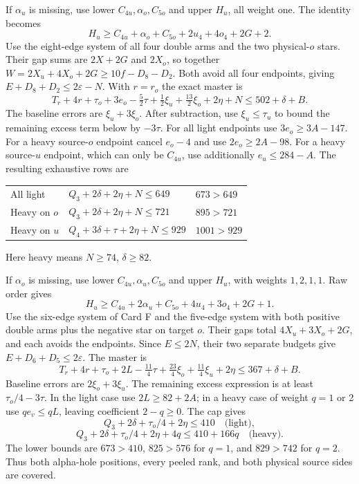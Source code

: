 \documentclass[11pt,letterpaper]{article}
\theoremstyle{definition}\newtheorem{definition}[theorem]{Definition}
\begin{document}
If $\alpha_u$ is missing, use lower $C_{4u},\alpha_o,C_{5o}$ and upper $H_u$, all weight one. The identity becomes
\[
 H_u\ge C_{4u}+\alpha_o+C_{5o}+2u_4+4o_4+2G+2.
\]
Use the eight-edge system of all four double arms and the two physical-$o$ stars. Their gap sums are $2X+2G$ and $2X_o$, so together $W=2X_u+4X_o+2G\ge10f-D_8-D_2$. Both avoid all four endpoints, giving $E+D_8+D_2\le2\varepsilon-N$. With $r=r_o$ the exact master is
\[
 T_r+4r+\tau_o+3e_o-\tfrac52\tau+\tfrac12\xi_u+\tfrac{13}2\xi_o+2\eta+N
 \le502+\delta+B.
\]
The baseline errors are $\xi_u+3\xi_o$. After subtraction, use $\xi_u\le\tau_u$ to bound the remaining excess term below by $-3\tau$. For all light endpoints use $3e_o\ge3A-147$. For a heavy source-$o$ endpoint cancel $e_o-4$ and use $2e_o\ge2A-98$. For a heavy source-$u$ endpoint, which can only be $C_{4u}$, use additionally $e_u\le284-A$. The resulting exhaustive rows are
\begin{center}\small
\begin{tabular}{lll}
All light&$Q_3+2\delta+2\eta+N\le649$&$673>649$\\
Heavy on $o$&$Q_3+2\delta+2\eta+N\le721$&$895>721$\\
Heavy on $u$&$Q_4+3\delta+\tau+2\eta+N\le929$&$1001>929$
\end{tabular}
\end{center}
Here heavy means $N\ge74$, $\delta\ge82$.

If $\alpha_o$ is missing, use lower $C_{4u},\alpha_u,C_{5o}$ and upper $H_u$, with weights $1,2,1,1$. Raw order gives
\[
 H_u\ge C_{4u}+2\alpha_u+C_{5o}+4u_4+3o_4+2G+1.
\]
Use the six-edge system of Card F and the five-edge system with both positive double arms plus the negative star on target $o$. Their gaps total $4X_u+3X_o+2G$, and each avoids the endpoints. Since $E\le2N$, their two separate budgets give $E+D_6+D_5\le2\varepsilon$. The master is
\[
 T_r+4r+\tau_o+2L-\tfrac{11}4\tau+\tfrac{23}4\xi_o+\tfrac{11}4\xi_u+2\eta
 \le367+\delta+B.
\]
Baseline errors are $2\xi_o+3\xi_u$. The remaining excess expression is at least $\tau_o/4-3\tau$. In the light case use $2L\ge82+2A$; in a heavy case of weight $q=1$ or 2 use $qe_v\le qL$, leaving coefficient $2-q\ge0$. The cap gives
\[
 Q_3+2\delta+\tau_o/4+2\eta\le410\quad\text{(light)},
\]
\[
 Q_3+2\delta+\tau_o/4+2\eta+4q\le410+166q\quad\text{(heavy)}.
\]
The lower bounds are $673>410$, $825>576$ for $q=1$, and $829>742$ for $q=2$. Thus both alpha-hole positions, every peeled rank, and both physical source sides are covered.
\end{document}
